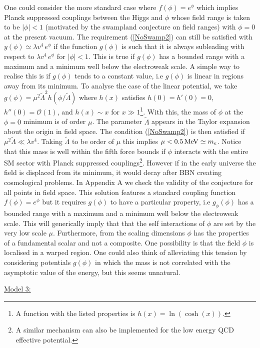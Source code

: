 \documentclass[11pt,a4paper]{article}
\newcommand{\mc}{\mathcal}
\begin{document}
\begin{itemize}
One could consider the more standard case where $f(\phi) =  e^{\phi}$ which implies Planck suppressed couplings between the Higgs and $\phi$ whose field range is taken to be $|\phi| < 1$ (motivated by the swampland conjecture on field ranges) with $\phi=0$ at the present vacuum. The requirement (\ref{NoSwamp2}) can still be satisfied with $y(\phi)\simeq \lambda v^4\,e^\phi$ if the function $g(\phi)$ is such that it is always subleading with respect to $\lambda v^4\,e^\phi$ for $|\phi| < 1$. This is true if $g(\phi)$ has a bounded range with a maximum and a minimum well below the electroweak scale. A simple way to realise this is if $g(\phi)$ tends to a constant value, i.e $g(\phi)$ is linear in regions away from its minimum. To analyse the case of the linear potential, we take $g(\phi) = \mu^2 \tilde{\Lambda}^2 h (\phi/ \tilde{\Lambda})$ where $h(x)$ satisfies $h(0) = h'(0) = 0$, $h''(0) = \mc{O}(1)$, and $h(x) \sim x$ for $x \gg 1$\footnote{A function with the listed properties is $h(x) = \ln( \cosh(x))$.}. With this, the mass of $\phi$ at the $\phi=0$ minimum is of order $\mu$. The parameter $\tilde{\Lambda}$ appears in the Taylor expansion about the origin in field space. The condition (\ref{NoSwamp2}) is then satisfied if $\mu^2 \tilde{\Lambda} \ll \lambda v^4$. Taking $\tilde{\Lambda}$ to be order of $\mu$ this implies $\mu < 0.5 \,{\rm MeV} \simeq m_e$. Notice that this mass is well within the fifth force bounds if $\phi$ interacts with the entire SM sector with Planck suppressed couplings\footnote{A similar mechanism can also be implemented for the low energy QCD effective potential.}. However if in the early universe the field is displaced from its minimum, it would decay after BBN creating cosmological problems. In Appendix A we check the validity of the conjecture for all points in field space. This solution features a standard coupling function $f(\phi)=e^\phi$ but it requires $g(\phi)$ to have a particular property, i.e $g_{\phi}(\phi)$ has a bounded range with a maximum and a minimum well below the electroweak scale. This will generically imply that that the self interactions of $\phi$ are set by the very low scale $\mu$. Furthermore, from the scaling dimensions $\phi$ has the properties of a fundamental scalar and not a composite. One possibility is that the field $\phi$ is localised in a warped region. One could also think of alleviating this tension by considering potentials $g(\phi)$ in which the mass is not correlated with the asymptotic value of the energy, but this seems unnatural.

\underline{Model 3:}


\end{itemize}
\end{document}
